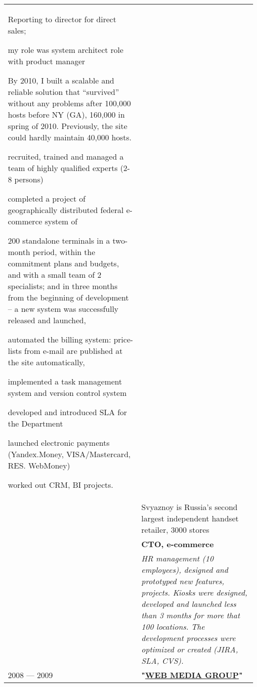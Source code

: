 \documentclass[11pt]{article}
\newif\ifdetailed
\newif\iftwopage
\begin{document}
\begin{longtable} {l | p{}}
\ifdetailed
& {\textbf{CTO, e-commerce}} {\color{gray}\small{// Reporting to Director for direct sales}}
\begin{itemize}
\iftwopage
\else
\item Reporting to director for direct sales;
\item my role was system architect role with product manager
\fi
\item By 2010, I built a scalable and reliable solution that “survived” without any problems after
100,000 hosts before NY (GA), 160,000 in spring of 2010. Previously, the site could hardly maintain 40,000 hosts.
\item recruited, trained and managed a team of highly qualified experts (2-8 persons)
\item completed a project of geographically distributed federal e-commerce system of
\item 200 standalone terminals in a two-month period, within the commitment plans and
budgets, and with a small team of 2 specialists; and in three months from the
beginning of development – a new system was successfully released and
launched,
\item automated the billing system: price-lists from e-mail are published at the site
automatically,
\item implemented a task management system and version control system
\item developed and introduced SLA for the Department
\item launched electronic payments (Yandex.Money, VISA/Mastercard, RES.
WebMoney)
\item worked out CRM, BI projects.
\end{itemize}
\\
\vspace{1.5em} & Svyaznoy is Russia’s second largest independent handset retailer, 3000 stores \\
\fi

\ifdetailed
\else
& {\textbf{CTO, e-commerce}} \\
\vspace{1em} &  {\it{HR management (10 employees),  designed and prototyped new features, projects. Kiosks were designed, developed and launched less than 3 months for more that 100 locations. The development processes were optimized or created (JIRA, SLA, CVS).
}} \\
\fi

2008 — 2009 & {\textbf{"\href{http://webmediagroup.ru}{WEB MEDIA GROUP}"}}\\


\end{longtable}
\end{document}

